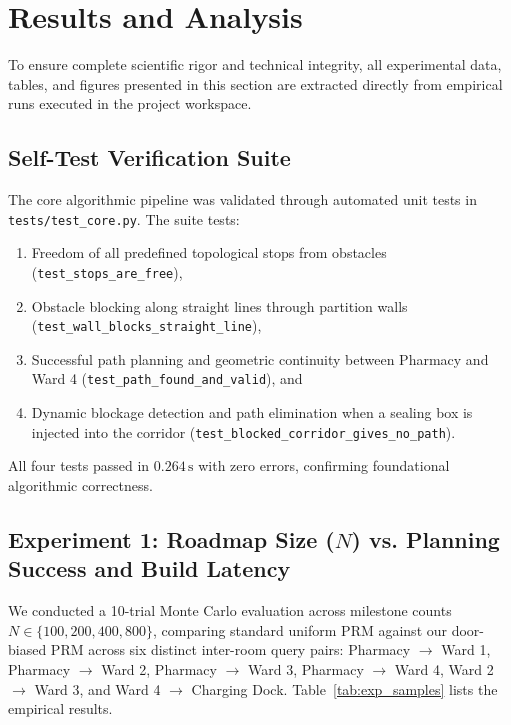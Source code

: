 \documentclass[12pt,a4paper]{article}
\begin{document}
\section{Results and Analysis}

To ensure complete scientific rigor and technical integrity, all experimental data, tables, and figures presented in this section are extracted directly from empirical runs executed in the project workspace.

\subsection{Self-Test Verification Suite}
The core algorithmic pipeline was validated through automated unit tests in \texttt{tests/test\_core.py}. The suite tests:
\begin{enumerate}[itemsep=1pt,topsep=1pt]
\item Freedom of all predefined topological stops from obstacles (\texttt{test\_stops\_are\_free}),
\item Obstacle blocking along straight lines through partition walls (\texttt{test\_wall\_blocks\_straight\_line}),
\item Successful path planning and geometric continuity between Pharmacy and Ward 4 (\texttt{test\_path\_found\_and\_valid}), and
\item Dynamic blockage detection and path elimination when a sealing box is injected into the corridor (\texttt{test\_blocked\_corridor\_gives\_no\_path}).
\end{enumerate}
All four tests passed in $0.264\,\text{s}$ with zero errors, confirming foundational algorithmic correctness.

\subsection{Experiment 1: Roadmap Size ($N$) vs. Planning Success and Build Latency}
We conducted a 10-trial Monte Carlo evaluation across milestone counts $N \in \{100, 200, 400, 800\}$, comparing standard uniform PRM against our door-biased PRM across six distinct inter-room query pairs: Pharmacy $\rightarrow$ Ward 1, Pharmacy $\rightarrow$ Ward 2, Pharmacy $\rightarrow$ Ward 3, Pharmacy $\rightarrow$ Ward 4, Ward 2 $\rightarrow$ Ward 3, and Ward 4 $\rightarrow$ Charging Dock. Table~\ref{tab:exp_samples} lists the empirical results.
\end{document}
